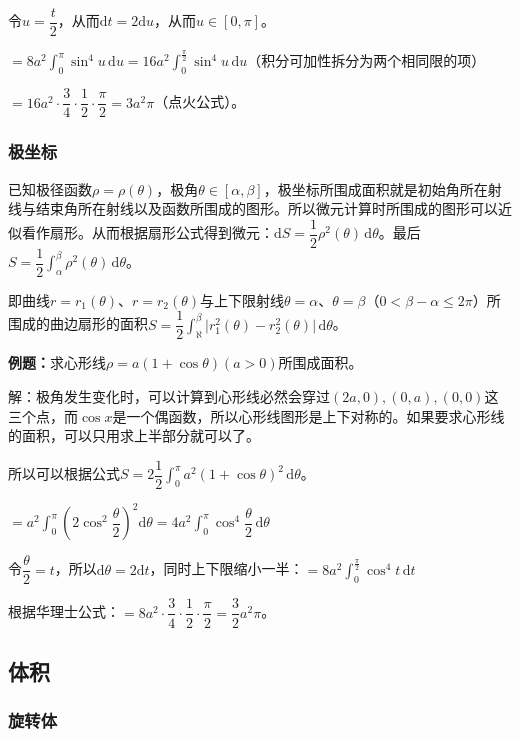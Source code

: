 \documentclass[UTF8, 12pt]{ctexart}
\begin{document}
令$u=\dfrac{t}{2}$，从而$\textrm{d}t=2\textrm{d}u$，从而$u\in[0,\pi]$。

$=8a^2\int_0^\pi\sin^4u\,\textrm{d}u=16a^2\int_0^{\frac{\pi}{2}}\sin^4u\,\textrm{d}u$（积分可加性拆分为两个相同限的项）

$=16a^2\cdot\dfrac{3}{4}\cdot\dfrac{1}{2}\cdot\dfrac{\pi}{2}=3a^2\pi$（点火公式）。

\subsubsection{极坐标}

已知极径函数$\rho=\rho(\theta)$，极角$\theta\in[\alpha,\beta]$，极坐标所围成面积就是初始角所在射线与结束角所在射线以及函数所围成的图形。所以微元计算时所围成的图形可以近似看作扇形。从而根据扇形公式得到微元：$\textrm{d}S=\dfrac{1}{2}\rho^2(\theta)\,\textrm{d}\theta$。最后$S=\dfrac{1}{2}\int_\alpha^\beta\rho^2(\theta)\,\textrm{d}\theta$。

即曲线$r=r_1(\theta)$、$r=r_2(\theta)$与上下限射线$\theta=\alpha$、$\theta=\beta$（$0<\beta-\alpha\leqslant2\pi$）所围成的曲边扇形的面积$S=\dfrac{1}{2}\int_\aleph^\beta\vert r_1^2(\theta)-r_2^2(\theta)\vert\,\textrm{d}\theta$。

\textbf{例题：}求心形线$\rho=a(1+\cos\theta)(a>0)$所围成面积。

解：极角发生变化时，可以计算到心形线必然会穿过$(2a,0),(0,a),(0,0)$这三个点，而$\cos x$是一个偶函数，所以心形线图形是上下对称的。如果要求心形线的面积，可以只用求上半部分就可以了。

所以可以根据公式$S=2\dfrac{1}{2}\int_0^\pi a^2(1+\cos\theta)^2\,\textrm{d}\theta$。

$=a^2\displaystyle{\int_0^\pi\left(2\cos^2\dfrac{\theta}{2}\right)^2\textrm{d}\theta}=4a^2\displaystyle{\int_0^\pi\cos^4\dfrac{\theta}{2}\,\textrm{d}\theta}$

令$\dfrac{\theta}{2}=t$，所以$\textrm{d}\theta=2\textrm{d}t$，同时上下限缩小一半：$=8a^2\int_0^{\frac{\pi}{2}}\cos^4t\,\textrm{d}t$

根据华理士公式：$=8a^2\cdot\dfrac{3}{4}\cdot\dfrac{1}{2}\cdot\dfrac{\pi}{2}=\dfrac{3}{2}a^2\pi$。

\subsection{体积}

\subsubsection{旋转体}
\end{document}
